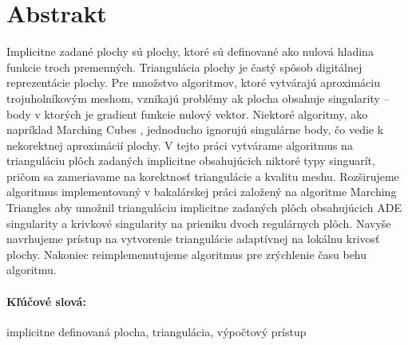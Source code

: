 \documentclass[12pt, twoside]{book}
\begin{document}

\newpage 
\section*{Abstrakt}

Implicitne zadané plochy sú plochy, ktoré sú definované ako nulová hladina
funkcie troch premenných. Triangulácia plochy je častý spôsob digitálnej reprezentácie
plochy.
Pre množstvo algoritmov, ktoré vytvárajú aproximáciu trojuholníkovým meshom,
vznikajú problémy ak plocha obsahuje singularity -- body v ktorých je gradient funkcie
nulový vektor.
Niektoré algoritmy, ako napríklad Marching Cubes \cite{lorensen1987marching},
jednoducho ignorujú singulárne body, čo vedie k nekorektnej aproximácií plochy.
V tejto práci vytvárame algoritmus na trianguláciu plôch zadaných implicitne
obsahujúcich niktoré typy singuarít, pričom sa zameriavame na korektnosť
triangulácie a kvalitu meshu.
Rozširujeme algoritmus implementovaný v bakalárskej práci \cite{korecova2021triangulation}
založený na algoritme Marching Triangles \cite{hilton1996marching}
aby umožnil trianguláciu implicitne zadaných plôch obsahujúcich 
ADE singularity a krivkové singularity na prieniku dvoch regulárnych plôch.
Navyše navrhujeme prístup na vytvorenie triangulácie adaptívnej na 
lokálnu krivosť plochy. Nakoniec reimplemenutujeme algoritmus 
\cite{korecova2021triangulation} pre zrýchlenie času behu algoritmu.
\paragraph*{Kľúčové slová:} implicitne definovaná plocha, triangulácia, výpočtový prístup



\newpage 
\end{document}
